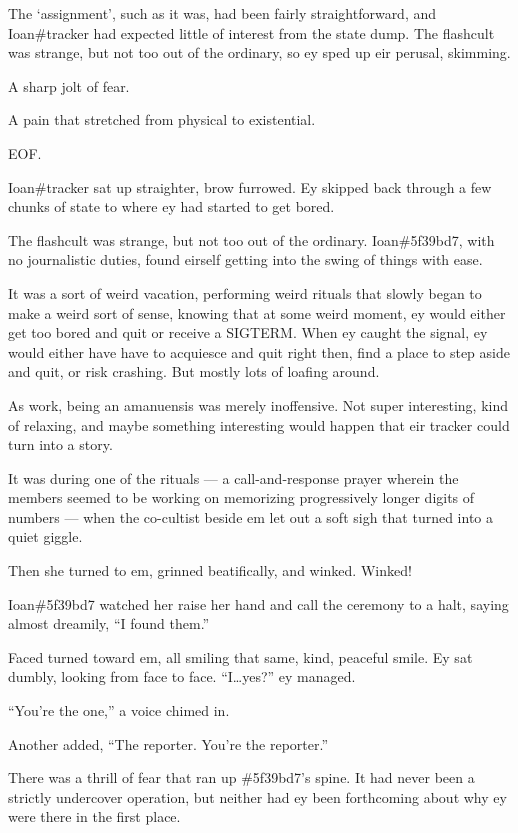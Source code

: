 The `assignment', such as it was, had been fairly straightforward, and Ioan\#tracker had expected little of interest from the state dump. The flashcult was strange, but not too out of the ordinary, so ey sped up eir perusal, skimming.

A sharp jolt of fear.

A pain that stretched from physical to existential.

EOF.

Ioan\#tracker sat up straighter, brow furrowed. Ey skipped back through a few chunks of state to where ey had started to get bored.

\secdiv{}

\noindent The flashcult was strange, but not too out of the ordinary. Ioan\#5f39bd7, with no journalistic duties, found eirself getting into the swing of things with ease.

It was a sort of weird vacation, performing weird rituals that slowly began to make a weird sort of sense, knowing that at some weird moment, ey would either get too bored and quit or receive a SIGTERM. When ey caught the signal, ey would either have have to acquiesce and quit right then, find a place to step aside and quit, or risk crashing. But mostly lots of loafing around.

As work, being an amanuensis was merely inoffensive. Not super interesting, kind of relaxing, and maybe something interesting would happen that eir tracker could turn into a story.

It was during one of the rituals --- a call-and-response prayer wherein the members seemed to be working on memorizing progressively longer digits of numbers --- when the co-cultist beside em let out a soft sigh that turned into a quiet giggle.

Then she turned to em, grinned beatifically, and winked. Winked!

Ioan\#5f39bd7 watched her raise her hand and call the ceremony to a halt, saying almost dreamily, ``I found them.''

Faced turned toward em, all smiling that same, kind, peaceful smile. Ey sat dumbly, looking from face to face. ``I\ldots{}yes?'' ey managed.

``You're the one,'' a voice chimed in.

Another added, ``The reporter. You're the reporter.''

There was a thrill of fear that ran up \#5f39bd7's spine. It had never been a strictly undercover operation, but neither had ey been forthcoming about why ey were there in the first place.

